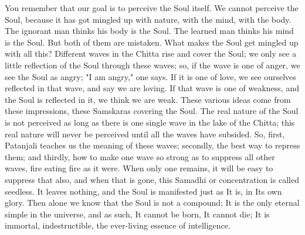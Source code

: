 You remember that our goal is to perceive the Soul itself. We
cannot perceive the Soul, because it has got mingled up with nature,
with the mind, with the body. The ignorant man thinks his body is the
Soul. The learned man thinks his mind is the Soul. But both of them are
mistaken. What makes the Soul get mingled up with all this? Different
waves in the Chitta rise and cover the Soul; we only see a little
reflection of the Soul through these waves; so, if the wave is one of
anger, we see the Soul as angry; "I am angry," one says. If it is one
of love, we see ourselves reflected in that wave, and say we are
loving. If that wave is one of weakness, and the Soul is reflected in
it, we think we are weak. These various ideas come from these
impressions, these Samskaras covering the Soul. The real nature of the
Soul is not perceived as long as there is one single wave in the lake
of the Chitta; this real nature will never be perceived until all the
waves have subsided. So, first, Patanjali teaches us the meaning of
these waves; secondly, the best way to repress them; and thirdly, how
to make one wave so strong as to suppress all other waves, fire eating
fire as it were. When only one remains, it will be easy to suppress
that also, and when that is gone, this Samadhi or concentration is
called seedless. It leaves nothing, and the Soul is manifested just as
It is, in Its own glory. Then alone we know that the Soul is not a
compound; It is the only eternal simple in the universe, and as such,
It cannot be born, It cannot die; It is immortal, indestructible, the
ever-living essence of intelligence. \\

